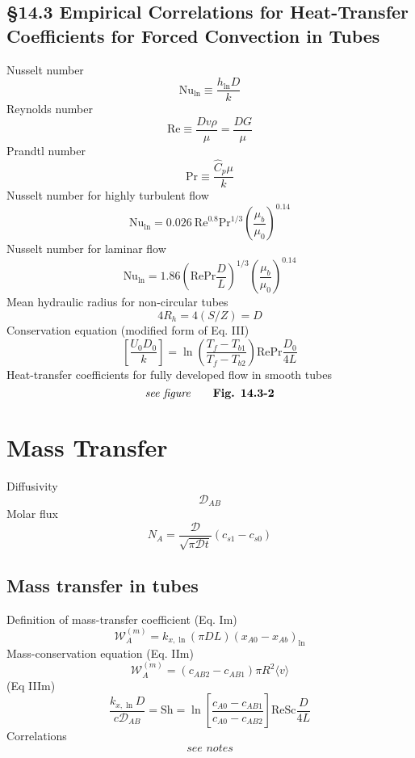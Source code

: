 \subsection{\S14.3 Empirical Correlations for Heat-Transfer Coefficients for Forced Convection in Tubes}
Nusselt number
\[
	\text{Nu}_{\ln}\equiv\frac{h_{\ln}D}{k}\tag*{Lecture notes 15.4}
\]
Reynolds number
\[
	\text{Re}\equiv\frac{Dv\rho}{\mu}=\frac{DG}{\mu}\tag*{Lecture notes 15.4}
\]
Prandtl number
\[
	\text{Pr}\equiv\frac{\hat{C}_p\mu}{k}\tag*{Lecture notes 15.4}
\]
Nusselt number for highly turbulent flow
\[
	\text{Nu}_{\ln}=0.026\ \text{Re}^{0.8}\text{Pr}^{1/3}\left(\frac{\mu_b}{\mu_0}\right)^{0.14}\tag{14.3-16}
\]
Nusselt number for laminar flow
\[
	\text{Nu}_{\ln}=1.86\left(\text{Re}\text{Pr}\frac{D}{L}\right)^{1/3}\left(\frac{\mu_b}{\mu_0}\right)^{0.14}\tag{14.3-17}
\]
Mean hydraulic radius for non-circular tubes
\[
	4R_h=4(S/Z)=D\tag*{Lecture notes 15.5}
\]
Conservation equation (modified form of Eq. III)
\[
	\left[\frac{U_0D_0}{k}\right]=\ln\left(\frac{T_f-T_{b1}}{T_f-T_{b2}}\right)\text{Re}\text{Pr}\frac{D_0}{4L}\tag*{Lecture notes 15.6}
\]
Heat-transfer coefficients for fully developed flow in smooth tubes
\[
	\textit{see figure}\tag*{\textbf{Fig. 14.3-2}}
\]
\section{Mass Transfer}
Diffusivity
\[
	\mathscr{D}_{AB}\tag*{Lecture notes 19.1}
\]
Molar flux
\[
	N_A=\frac{\mathscr{D}}{\sqrt{\pi \mathscr{D}t}}(c_{s1}-c_{s0})\tag*{Lecture notes 19.3}
\]
\subsection{Mass transfer in tubes}
Definition of mass-transfer coefficient (Eq. Im)
\[
	\mathscr{W}_A^{(m)}=k_{x,\ln}(\pi DL)(x_{A0}-x_{Ab})_{\ln}\tag*{Lecture notes 20.1}
\]
Mass-conservation equation (Eq. IIm)
\[
	\mathscr{W}_A^{(m)}=(c_{AB2}-c_{AB1})\pi R^2\langle v\rangle\tag*{Lecture notes 20.1}
\]
(Eq IIIm)
\[
	\frac{k_{x,\ln}D}{c\mathscr{D}_{AB}}=\text{Sh}=\ln\left[\frac{c_{A0}-c_{AB1}}{c_{A0}-c_{AB2}}\right]\text{Re}\text{Sc}\frac{D}{4L}\tag*{Lecture notes 20.1}
\]
Correlations
\[
	\textit{see notes}\tag*{Lecture notes 20.3}
\]